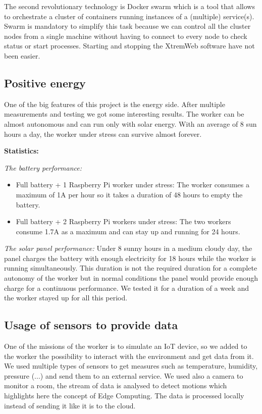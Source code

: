     The second revolutionary technology is Docker swarm which is a tool that allows to orchestrate a cluster
    of containers running instances of a (multiple) service(s). Swarm is mandatory to simplify this task
    because we can control all the cluster nodes from a single machine without having to connect to every node
    to check status or start processes. Starting and stopping the XtremWeb software have not been easier.

    \subsection{Positive energy}
    One of the big features of this project is the energy side. After multiple measurements and
    testing we got some interesting results. The worker can be almost autonomous and can run only with solar
    energy. With an average of 8 sun hours a day, the worker under stress can survive almost forever.

    \textbf{Statistics:}

    \textit{The battery performance:}

    \begin{itemize}
        \item Full battery + 1 Raspberry Pi worker under stress: The worker consumes a maximum of 1A per hour
        so it takes a duration of 48 hours to empty the battery.

        \item Full battery + 2 Raspberry Pi workers under stress: The two workers consume 1.7A as a maximum and
        can stay up and running for 24 hours.
    \end{itemize}

    \textit{The solar panel performance:}
    Under 8 sunny hours in a medium cloudy day, the panel charges the battery with enough electricity for 18
    hours while the worker is running simultaneously. This duration is not the required
    duration for a complete autonomy of the worker but in normal conditions the panel would provide enough
    charge for a continuous performance. We tested it for a duration of a week and the worker stayed up for
    all this period.

    \subsection{Usage of sensors to provide data}
    One of the missions of the worker is to simulate an IoT device, so we added to the worker the possibility
    to interact with the environment and get data from it. We used multiple types of sensors to get measures
    such as temperature, humidity, pressure (...) and send them to an external service. We used also a camera
    to monitor a room, the stream of data is analysed to detect motions which highlights here the concept
    of Edge Computing. The data is processed locally instead of sending it like it is to the cloud.

